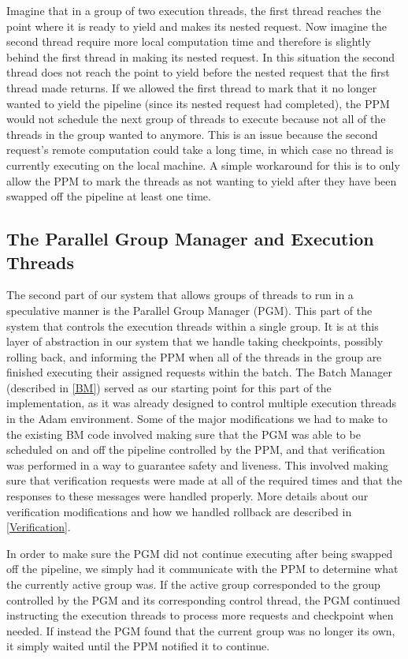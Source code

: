 \documentclass[11pt, oneside]{report}
\begin{document}
Imagine that in a group of two execution threads, the first thread reaches the point where it is ready to yield and makes its nested request. 
Now imagine the second thread require more local computation time and therefore is slightly behind the first thread in making its nested request.
In this situation the second thread does not reach the point to yield before the nested request that the first thread made returns.
If we allowed the first thread to mark that it no longer wanted to yield the pipeline (since its nested request had completed), the PPM would not schedule the next group of threads to execute because not all of the threads in the group wanted to anymore.
This is an issue because the second request's remote computation could take a long time, in which case no thread is currently executing on the local machine.
A simple workaround for this is to only allow the PPM to mark the threads as not wanting to yield after they have been swapped off the pipeline at least one time.

\subsection{The Parallel Group Manager and Execution Threads}

The second part of our system that allows groups of threads to run in a speculative manner is the Parallel Group Manager (PGM). This part of the system that controls the execution threads within a single group.
It is at this layer of abstraction in our system that we handle taking checkpoints, possibly rolling back, and informing the PPM when all of the threads in the group are finished executing their assigned requests within the batch.
The Batch Manager (described in \ref{BM}) served as our starting point for this part of the implementation, as it was already designed to control multiple execution threads in the Adam environment.
Some of the major modifications we had to make to the existing BM code involved making sure that the PGM was able to be scheduled on and off the pipeline controlled by the PPM, and that verification was performed in a way to guarantee safety and liveness. 
This involved making sure that verification requests were made at all of the required times and that the responses to these messages were handled properly. 
More details about our verification modifications and how we handled rollback are described in \ref{Verification}. 

In order to make sure the PGM did not continue executing after being swapped off the pipeline, we simply had it communicate with the PPM to determine what the currently active group was. 
If the active group corresponded to the group controlled by the PGM and its corresponding control thread, the PGM continued instructing the execution threads to process more requests and checkpoint when needed. 
If instead the PGM found that the current group was no longer its own, it simply waited until the PPM notified it to continue.
\end{document}
